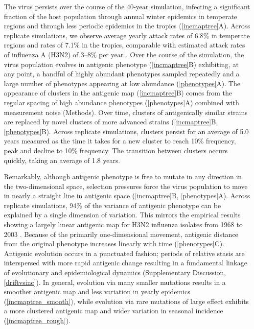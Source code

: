 The virus persists over the course of the 40-year simulation, infecting a significant fraction of the host population through annual winter epidemics in temperate regions and through less periodic epidemics in the tropics (\ref{incmaptree}A).  Across replicate simulations, we observe average yearly attack rates of 6.8\% in temperate regions and rates of 7.1\% in the tropics, comparable with estimated attack rates of influenza A (H3N2) of 3--8\% per year \cite{Monto93,Koelle09}.  Over the course of the simulation, the virus population evolves in antigenic phenotype (\ref{incmaptree}B) exhibiting, at any point, a handful of highly abundant phenotypes sampled repeatedly and a large number of phenotypes appearing at low abundance (\ref{phenotypes}A).  The appearance of clusters in the antigenic map (\ref{incmaptree}B) comes from the regular spacing of high abundance phenotypes (\ref{phenotypes}A) combined with measurement noise (Methods).  Over time, clusters of antigenically similar strains are replaced by novel clusters of more advanced strains (\ref{incmaptree}B, \ref{phenotypes}B).  Across replicate simulations, clusters persist for an average of 5.0 years measured as the time it takes for a new cluster to reach 10\% frequency, peak and decline to 10\% frequency.  The transition between clusters occurs quickly, taking an average of 1.8 years.

Remarkably, although antigenic phenotype is free to mutate in any direction in the two-dimensional space, selection pressures force the virus population to move in nearly a straight line in antigenic space (\ref{incmaptree}B, \ref{phenotypes}A).  Across replicate simulations, 94\% of the variance of antigenic phenotype can be explained by a single dimension of variation.  This mirrors the empirical results showing a largely linear antigenic map for H3N2 influenza isolates from 1968 to 2003 \cite{Smith04}.  Because of the primarily one-dimensional movement, antigenic distance from the original phenotype increases linearly with time (\ref{phenotypes}C).  Antigenic evolution occurs in a punctuated fashion; periods of relative stasis are interspersed with more rapid antigenic change resulting in a fundamental linkage of evolutionary and epidemiological dynamics (Supplementary Discussion, \ref{driftvsinc}).  In general, evolution via many smaller mutations results in a smoother antigenic map and less variation in yearly epidemics (\ref{incmaptree_smooth}), while evolution via rare mutations of large effect exhibits a more clustered antigenic map and wider variation in seasonal incidence (\ref{incmaptree_rough}).

